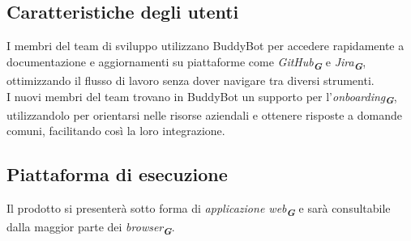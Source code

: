 \subsection{Caratteristiche degli utenti}
I membri del team di sviluppo utilizzano BuddyBot per accedere rapidamente a documentazione e aggiornamenti su piattaforme come 
\emph{GitHub}\textsubscript{\textit{\textbf{G}}} e \emph{Jira}\textsubscript{\textit{\textbf{G}}}, ottimizzando il flusso di lavoro senza dover navigare tra diversi strumenti.\\
I nuovi membri del team trovano in BuddyBot un supporto per l'\emph{onboarding}\textsubscript{\textit{\textbf{G}}}, utilizzandolo per 
orientarsi nelle risorse aziendali e ottenere risposte a domande comuni, facilitando così la loro integrazione.

\subsection{Piattaforma di esecuzione}
Il prodotto si presenterà sotto forma di \emph{applicazione web}\textsubscript{\textit{\textbf{G}}} e sarà consultabile dalla maggior
parte dei \emph{browser}\textsubscript{\textit{\textbf{G}}}.